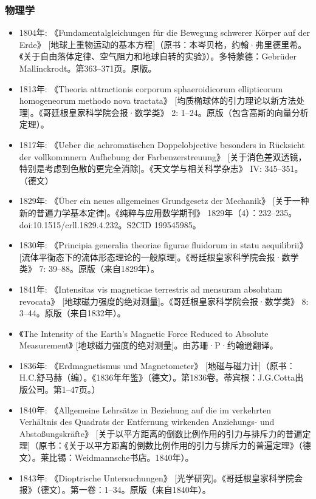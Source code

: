 \subsubsection{物理学}
\begin{itemize}
\item 1804年: 《Fundamentalgleichungen für die Bewegung schwerer Körper auf der Erde》 [地球上重物运动的基本方程]（原书：本岑贝格，约翰·弗里德里希。《关于自由落体定律、空气阻力和地球自转的实验》）。多特蒙德：Gebrüder Mallinckrodt。第363–371页。原版。
\item 1813年: 《Theoria attractionis corporum sphaeroidicorum ellipticorum homogeneorum methodo nova tractata》 [均质椭球体的引力理论以新方法处理]。《哥廷根皇家科学院会报·数学类》 2: 1–24。原版（包含高斯的向量分析定理）。
\item 1817年: 《Ueber die achromatischen Doppelobjective besonders in Rücksicht der vollkommnern Aufhebung der Farbenzerstreuung》 [关于消色差双透镜，特别是考虑到色散的更完全消除]。《天文学与相关科学杂志》 IV: 345–351。（德文）
\item 1829年: 《Über ein neues allgemeines Grundgesetz der Mechanik》 [关于一种新的普遍力学基本定律]。《纯粹与应用数学期刊》 1829年（4）：232–235。doi:10.1515/crll.1829.4.232。S2CID 199545985。
\item 1830年: 《Principia generalia theoriae figurae fluidorum in statu aequilibrii》 [流体平衡态下的流体形态理论的一般原理]。《哥廷根皇家科学院会报·数学类》 7: 39–88。原版（来自1829年）。
\item 1841年: 《Intensitas vis magneticae terrestris ad mensuram absolutam revocata》 [地球磁力强度的绝对测量]。《哥廷根皇家科学院会报·数学类》 8: 3–44。原版（来自1832年）。
\item 《The Intensity of the Earth's Magnetic Force Reduced to Absolute Measurement》 [地球磁力强度的绝对测量]。由苏珊·P·约翰逊翻译。
\item 1836年: 《Erdmagnetismus und Magnetometer》 [地磁与磁力计]（原书：H.C.舒马赫（编）。《1836年年鉴》（德文）。第1836卷。蒂宾根：J.G.Cotta出版公司。第1–47页。）
\item 1840年: 《Allgemeine Lehrsätze in Beziehung auf die im verkehrten Verhältnis des Quadrats der Entfernung wirkenden Anziehungs- und Abstoßungskräfte》 [关于以平方距离的倒数比例作用的引力与排斥力的普遍定理]（原书：《关于以平方距离的倒数比例作用的引力与排斥力的普遍定理》（德文）。莱比锡：Weidmannsche书店。1840年）。
\item 1843年: 《Dioptrische Untersuchungen》 [光学研究]。《哥廷根皇家科学院会报》（德文）。第一卷：1–34。原版（来自1840年）。
\end{itemize}

